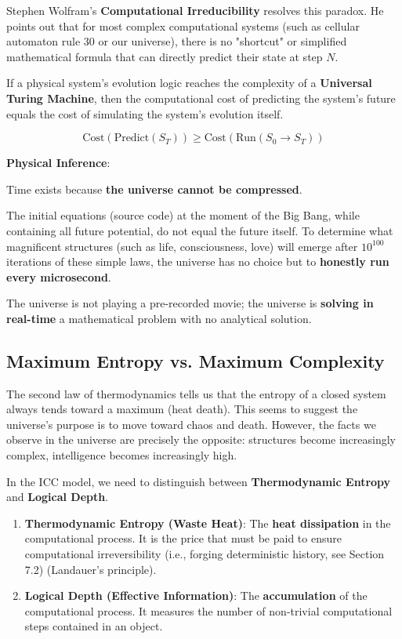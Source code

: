 Stephen Wolfram's \textbf{Computational Irreducibility} resolves this paradox. He points out that for most complex computational systems (such as cellular automaton rule 30 or our universe), there is no "shortcut" or simplified mathematical formula that can directly predict their state at step $N$.

\begin{theorem}
If a physical system's evolution logic reaches the complexity of a \textbf{Universal Turing Machine}, then the computational cost of predicting the system's future equals the cost of simulating the system's evolution itself.

\begin{equation}
\text{Cost}(\text{Predict}(S_T)) \ge \text{Cost}(\text{Run}(S_0 \to S_T))
\end{equation}
\end{theorem}

\textbf{Physical Inference}:

Time exists because \textbf{the universe cannot be compressed}.

The initial equations (source code) at the moment of the Big Bang, while containing all future potential, do not equal the future itself. To determine what magnificent structures (such as life, consciousness, love) will emerge after $10^{100}$ iterations of these simple laws, the universe has no choice but to \textbf{honestly run every microsecond}.

The universe is not playing a pre-recorded movie; the universe is \textbf{solving in real-time} a mathematical problem with no analytical solution.

\subsection{Maximum Entropy vs. Maximum Complexity}

The second law of thermodynamics tells us that the entropy of a closed system always tends toward a maximum (heat death). This seems to suggest the universe's purpose is to move toward chaos and death. However, the facts we observe in the universe are precisely the opposite: structures become increasingly complex, intelligence becomes increasingly high.

In the ICC model, we need to distinguish between \textbf{Thermodynamic Entropy} and \textbf{Logical Depth}.

\begin{enumerate}
\item \textbf{Thermodynamic Entropy (Waste Heat)}: The \textbf{heat dissipation} in the computational process. It is the price that must be paid to ensure computational irreversibility (i.e., forging deterministic history, see Section 7.2) (Landauer's principle).

\item \textbf{Logical Depth (Effective Information)}: The \textbf{accumulation} of the computational process. It measures the number of non-trivial computational steps contained in an object.
\end{enumerate}

